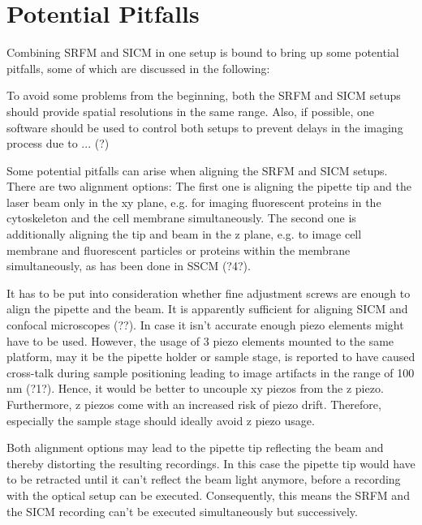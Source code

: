 \section{Potential Pitfalls}
\label{sec:pitfalls}
Combining SRFM and SICM in one setup is bound to bring up some potential
pitfalls, some of which are discussed in the following:

To avoid some problems from the beginning, both the SRFM and SICM setups
should provide spatial resolutions in the same range. Also, if possible, one
software should be used to control both setups to prevent delays in the
imaging process due to ... (?)

Some potential pitfalls can arise when aligning the SRFM and SICM
setups. There are two alignment options: The first one is aligning the pipette
tip and the laser beam only in the xy plane, e.g. for imaging fluorescent
proteins in the cytoskeleton and the cell membrane simultaneously. The second
one is additionally aligning the tip and beam in the z plane, e.g. to image
cell membrane and fluorescent particles or proteins within the membrane
simultaneously, as has been done in SSCM (?4?).

It has to be put into consideration whether fine adjustment screws are enough
to align the pipette and the beam. It is apparently sufficient for aligning
SICM and confocal microscopes (??). In case it isn't accurate enough piezo
elements might have to be used. However, the usage of 3 piezo elements mounted
to the same platform, may it be the pipette holder or sample stage, is
reported to have caused cross-talk during sample positioning leading to image
artifacts in the range of 100 nm (?1?). Hence, it would be better to uncouple
xy piezos from the z piezo. Furthermore, z piezos come with an increased risk
of piezo drift. Therefore, especially the sample stage should ideally avoid z
piezo usage.

Both alignment options may lead to the pipette tip reflecting the beam and
thereby distorting the resulting recordings. In this case the pipette tip
would have to be retracted until it can't reflect the beam light anymore,
before a recording with the optical setup can be executed. Consequently, this
means the SRFM and the SICM recording can't be executed simultaneously but
successively.


